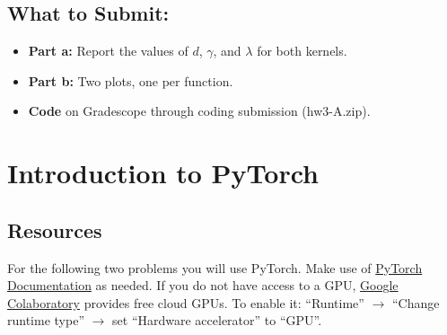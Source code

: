 \documentclass{article}
\begin{document}
\begin{aprob}
    \subsection*{What to Submit:}
    \begin{itemize}
        \item \textbf{Part a:} Report the values of $d$, $\gamma$, and $\lambda$ for both kernels.
        \item \textbf{Part b:} Two plots, one per function.
        \item \textbf{Code} on Gradescope through coding submission (hw3-A.zip).
    \end{itemize}
\end{aprob}

\section*{Introduction to PyTorch}
\subsection*{Resources}
For the following two problems you will use PyTorch.
Make use of \href{https://pytorch.org/docs/stable/index.html}{PyTorch Documentation} as needed.
If you do not have access to a GPU, \href{https://colab.research.google.com/}{Google Colaboratory} provides free cloud GPUs.
To enable it: ``Runtime'' $\to$ ``Change runtime type'' $\to$ set ``Hardware accelerator'' to ``GPU''.
\end{document}
